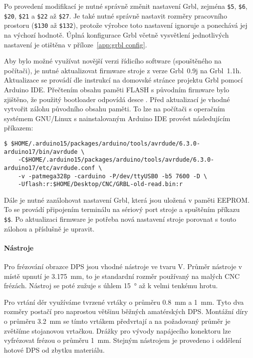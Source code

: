 Po provedení modifikací je nutné správně změnit nastavení Grbl, zejména
\verb|$5|, \verb|$6|, \verb|$20|, \verb|$21| a \verb|$22| až \verb|$27|.
Je také nutné správně nastavit rozměry pracovního prostoru (\verb|$130| až
\verb|$132|), protože výrobce toto nastavení ignoruje a ponechává jej na
výchozí hodnotě. Úplná konfigurace Grbl včetně vysvětlení jednotlivých
nastavení je otištěna v příloze~\vref{app:grbl config}.

Aby bylo možné využívat novější verzi řídicího software (spouštěného na
počítači), je nutné aktualizovat firmware stroje z verze Grbl~0.9j na
Grbl~1.1h. Aktualizace se provádí dle instrukcí na domovské stránce projektu
Grbl pomocí Arduino IDE. Přečtením obsahu paměti FLASH s původním firmware bylo
zjištěno, že použitý bootloader odpovídá desce . Před aktualizací je vhodné vytvořit zálohu původního obsahu
paměti. To lze na počítači s operačním systémem GNU/Linux s nainstalovaným
Arduino IDE provést následujícím příkazem:
\begin{lstlisting}[style=terminal]
$ $HOME/.arduino15/packages/arduino/tools/avrdude/6.3.0-arduino17/bin/avrdude \
    -C$HOME/.arduino15/packages/arduino/tools/avrdude/6.3.0-arduino17/etc/avrdude.conf \
    -v -patmega328p -carduino -P/dev/ttyUSB0 -b5 7600 -D \
    -Uflash:r:$HOME/Desktop/CNC/GRBL-old-read.bin:r
\end{lstlisting}
Dále je nutné zazálohovat nastavení Grbl, která jsou uložená v paměti EEPROM.
To se provádí připojením terminálu na sériový port stroje a spuštěním příkazu
\verb|$$|.
Po aktualizaci firmware je potřeba nová nastavení stroje porovnat s touto
zálohou a příslušně je upravit.

\paragraph{Nástroje}
Pro frézování obrazce DPS jsou vhodné nástroje ve tvaru V. Průměr nástroje
v místě upnutí je \SI{3,175}{\milli\meter}, to je standardní rozměr používaný
na malých CNC frézách. Nástroj se poté zužuje s úhlem
\SI{15}{\degree} až k velmi tenkému hrotu.

Pro vrtání děr využíváme tvrzené vrtáky o průměru \SI{0,8}{\milli\meter}
a \SI{1}{\milli\meter}. Tyto dva rozměry postačí pro naprostou většinu běžných
amatérských DPS. Montážní díry o průměru \SI{3,2}{\milli\meter} se tímto
vrtákem předvrtají a na požadovaný průměr je zvětšíme stojanovou vrtačkou.
Drážky pro vývody napájecího konektoru lze vyfrézovat frézou \uv{corn bit}
o průměru \SI{1}{\milli\meter}. Stejným nástrojem je provedeno i oddělení
hotové DPS od zbytku materiálu.

